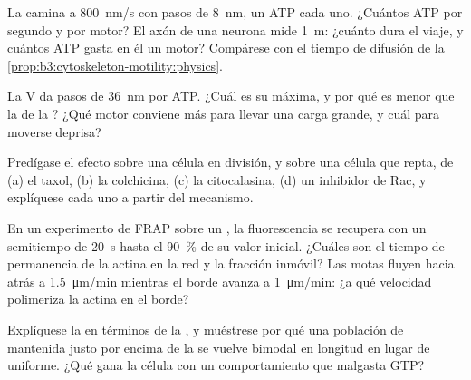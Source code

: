 \begin{exercise}[$\star\star$]\label{exo:b3:cytoskeleton-motility:6}
La  camina a \qty{800}{nm/s} con pasos de \qty{8}{nm}, un ATP
cada uno. ¿Cuántos ATP por segundo y por motor? El axón de una neurona
mide \qty{1}{m}: ¿cuánto dura el viaje, y cuántos ATP gasta en él un
motor? Compárese con el tiempo de difusión de la
\cref{prop:b3:cytoskeleton-motility:physics}.
\end{exercise}

\begin{exercise}[$\star\star$]\label{exo:b3:cytoskeleton-motility:7}
La  V da pasos de \qty{36}{nm} por ATP. ¿Cuál es su  máxima, y por qué es menor que la de la ? ¿Qué motor
conviene más para llevar una carga grande, y cuál para moverse deprisa?
\end{exercise}

\begin{exercise}[$\star\star$]\label{exo:b3:cytoskeleton-motility:8}
Predígase el efecto sobre una célula en división, y sobre una célula que
repta, de (a) el taxol, (b) la colchicina, (c) la citocalasina, (d) un
inhibidor de Rac, y explíquese cada uno a partir del mecanismo.
\end{exercise}

\begin{exercise}[$\star\star$]\label{exo:b3:cytoskeleton-motility:9}
En un experimento de FRAP sobre un , la fluorescencia se
recupera con un semitiempo de \qty{20}{s} hasta el \qty{90}{\%} de su
valor inicial. ¿Cuáles son el tiempo de permanencia de la actina en la
red y la fracción inmóvil? Las motas fluyen hacia atrás a
\qty{1.5}{\micro m/min} mientras el borde avanza a \qty{1}{\micro m/min}:
¿a qué velocidad polimeriza la actina en el borde?
\end{exercise}

\begin{exercise}[$\star\star\star$]\label{exo:b3:cytoskeleton-motility:10}
Explíquese la  en términos de la , y
muéstrese por qué una población de  mantenida justo por
encima de la  se vuelve bimodal en longitud en lugar
de uniforme. ¿Qué gana la célula con un comportamiento que malgasta GTP?
\end{exercise}

